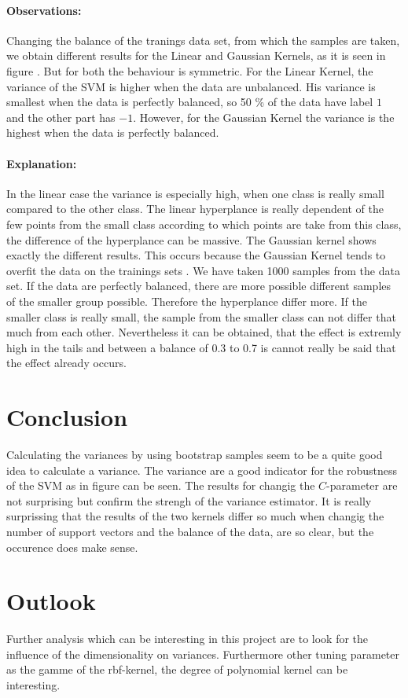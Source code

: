 \documentclass[a4paper]{article}
\begin{document}
\paragraph{Observations:}
Changing the balance of the tranings data set, from which the samples are taken, we obtain different results for the Linear and Gaussian Kernels, as it is seen in figure \label{fig5}. But for both the behaviour is symmetric. For the Linear Kernel, the variance of the SVM is higher when the data are unbalanced. His variance is smallest when the data is perfectly balanced, so 50 \% of the data have label $1$ and the other part has $-1$. However, for the Gaussian Kernel the variance is the highest when the data is perfectly balanced. 
\paragraph{Explanation:}
In the linear case the variance is especially high, when one class is really small compared to the other class. The linear hyperplance is really dependent of the few points from the small class according to which points are take from this class, the difference of the hyperplance can be massive.
The Gaussian kernel shows exactly the different results. This occurs because the Gaussian Kernel tends to overfit the data on the trainings sets \cite{hastie_elements_2005}. We have taken 1000 samples from the data set. If the data are perfectly balanced, there are more possible different samples of the smaller group possible. Therefore the hyperplance differ more. If the smaller class is really small, the sample from the smaller class can not differ that much from each other.
Nevertheless it can be obtained, that the effect is extremly high in the tails and between a balance of 0.3 to 0.7 is cannot really be said that the effect already occurs.


\section{Conclusion}

Calculating the variances by using bootstrap samples seem to be a quite good idea to calculate a variance. The variance are a good indicator for the robustness of the SVM as in figure \label{fig2} can be seen.
The results for changig the $C$-parameter are not surprising but confirm the strengh of the variance estimator.
It is really surprissing that the results of the two kernels differ so much when changig the number of support vectors and the balance of the data, are so clear, but the occurence does make sense.

\section{Outlook}

Further analysis which can be interesting in this project are to look for the influence of the dimensionality on variances. Furthermore other tuning parameter as the gamme of the rbf-kernel, the degree of polynomial kernel can be interesting. 


\footnotesize


\end{document}
